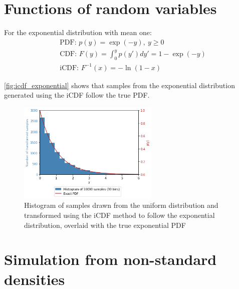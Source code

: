 \documentclass[a4paper]{article}
\begin{document}

\section{Functions of random variables}

For the exponential distribution with mean one:
\begin{align*}
    & \text{PDF: } p(y) = \exp(-y), \ y \geq 0 \\
    & \text{CDF: } F(y) = \int_0^y p(y') dy' = 1 - \exp(-y) \\
    & \text{iCDF: } F^{-1}(x) = -\ln(1 - x)
\end{align*}

\autoref{fig:icdf_exponential} shows that samples from the exponential distribution generated using the iCDF follow the
true PDF.

\begin{figure}[h]
\centering
\includegraphics[width=0.6\textwidth]{figures/icdf_exponential.png}
\caption{Histogram of samples drawn from the uniform distribution and transformed using the iCDF method to follow the
exponential distribution, overlaid with the true exponential PDF}
\label{fig:icdf_exponential}
\end{figure}



\section{Simulation from non-standard densities}
\end{document}
